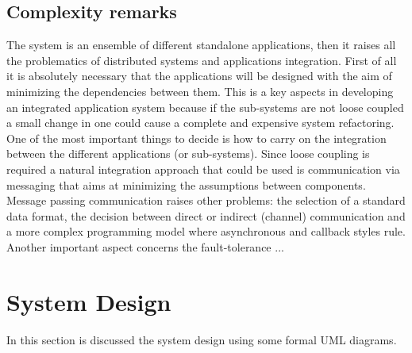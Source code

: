 \documentclass[11pt]{article}
\begin{document}
\subsection{Complexity remarks}
The system is an ensemble of different standalone applications, then it raises all the problematics of distributed systems and applications integration. First of all it is absolutely necessary that the applications will be designed with the aim of minimizing the dependencies between them. This is a key aspects in developing an integrated application system because if the sub-systems are not loose coupled a small change in one could cause a complete and expensive system refactoring. One of the most important things to decide is how to carry on the integration between the different applications (or sub-systems). Since loose coupling is required a natural integration approach that could be used is communication via messaging that aims at minimizing the assumptions between components. Message passing communication raises other problems: the selection of a standard data format, the decision between direct or indirect (channel) communication and a more complex programming model where asynchronous and callback styles rule. Another important aspect concerns the fault-tolerance ...

\section{System Design}
In this section is discussed the system design using some formal UML diagrams.
\end{document}
